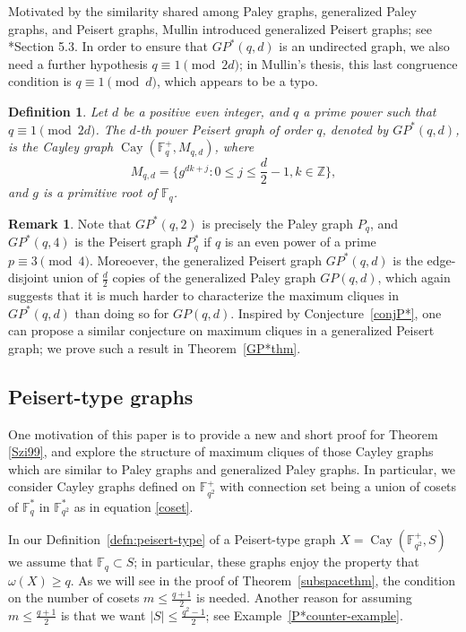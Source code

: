 \documentclass[12pt,reqno]{amsart}
\newtheorem{defn}[thm]{Definition}
\theoremstyle{definition}
\newtheorem{rem}[thm]{Remark}
\newcommand{\Z}{\mathbb{Z}}
\newcommand{\F}{\mathbb{F}}
\begin{document}
Motivated by the similarity shared among Paley graphs, generalized Paley graphs, and Peisert graphs, Mullin introduced generalized Peisert graphs; see \cite{NM}*{Section 5.3}. In order to ensure that $GP^*(q,d)$ is an undirected graph, we also need a further hypothesis $q \equiv 1 \pmod {2d}$; in Mullin's thesis, this last congruence condition is $q \equiv 1 \pmod d$, which appears to be a typo.

\begin{defn}
Let $d$ be a positive even integer, and $q$ a prime power such that $q \equiv 1 \pmod {2d}$. The {\em $d$-th power Peisert graph of order $q$}, denoted by $GP^*(q,d)$, is the Cayley graph $\operatorname{Cay}(\F_q^+, M_{q,d})$, where
$$
M_{q,d}=\bigg\{g^{dk+j}: 0\leq j \leq \frac{d}{2}-1, k \in \Z\bigg\},
$$
and $g$ is a primitive root of $\F_q$.
\end{defn}

\begin{rem}\label{peisert-paley-relation}
Note that $GP^*(q,2)$ is precisely the Paley graph $P_q$, and $GP^*(q,4)$ is the Peisert graph $P^*_q$ if $q$ is an even power of a prime $p \equiv 3 \pmod 4$. Moreoever, the generalized Peisert graph $GP^*(q,d)$ is the edge-disjoint union of $\frac{d}{2}$ copies of the generalized Paley graph $GP(q,d)$, which again suggests that it is much harder to characterize the maximum cliques in $GP^*(q,d)$ than doing so for $GP(q,d)$. Inspired by Conjecture~\ref{conjP*}, one can propose a similar conjecture on maximum cliques in a generalized Peisert graph; we prove such a result in Theorem~\ref{GP*thm}. 
\end{rem}


\subsection{Peisert-type graphs}\label{subsect:peisert-type}

One motivation of this paper is to provide a new and short proof for Theorem \ref{Szi99}, and explore the structure of maximum cliques of those Cayley graphs which are similar to Paley graphs and generalized Paley graphs. In particular, we consider Cayley graphs defined on $\F_{q^2}^+$ with connection set being a union of cosets of $\F_q^*$ in $\F_{q^2}^*$ as in equation \eqref{coset}. 

In our Definition~\ref{defn:peisert-type} of a Peisert-type graph $X=\operatorname{Cay}(\F_{q^2}^{+},S)$ we assume that $\F_q\subset S$; in particular, these graphs enjoy the property that $\omega(X)\geq q$. As we will see in the proof of Theorem~\ref{subspacethm}, the condition on the number of cosets $m\leq \frac{q+1}{2}$ is needed. Another reason for assuming $m\leq \frac{q+1}{2}$ is that we want $|S|\leq\frac{q^2-1}{2}$; see  Example~\ref{P*counter-example}.
\end{document}
